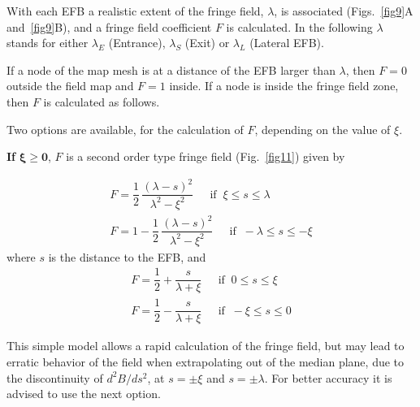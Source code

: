 {With  each EFB a realistic extent of the fringe field, $\lambda$, 
is associated (Figs.~\ref{fig9}A and~\ref{fig9}B),  
and a fringe field coefficient $ F$ is 
calculated. In the following $\lambda$ stands for either $ \lambda_ E $
(Entrance), $ \lambda_ S $ (Exit) or $ \lambda_ L $ (Lateral EFB). 
 
\noindent If a node of the map mesh is at a distance of the EFB larger than
$\lambda$, then $  F=0 $ outside the field map and $ F=1 $ inside.  
If a node is inside the fringe field zone, then $  F$   is calculated as follows. 

\bigskip 

\noindent Two options are available, for the calculation of $ F$, depending
on the value of $\xi$. 

\medskip
\noindent\textbf{If } $\mathbf{\xi  \geq 0}$, $ F $ is a  second
order type fringe field (Fig.~\ref{fig11}) given by 


\begin{gather}
		F  = \dfrac{1 }{ 2} \, \dfrac{(\lambda -s)^2 }{ \lambda^2-\xi^ 2} \quad 
		         ~~ \text{if }~   \xi  \leq  s \leq \lambda  \\
		F  = 1- \dfrac{1 }{ 2} \, \dfrac{(\lambda -s)^2 }{ \lambda^2-\xi^ 2}\quad 
		        ~~ \text{if }~   -\lambda  \leq  s \leq  -\xi 
\end{gather}
where $ s $ is the distance to the EFB, and
\begin{gather}
		 F  = \dfrac{1 }{ 2} + \dfrac{s }{ \lambda +\xi} \quad
		         ~~ \text{if }~  0 \leq  s \leq  \xi  \\
	    F   = \dfrac{1 }{ 2} - \dfrac{s }{ \lambda +\xi}\quad  
		       ~~ \text{if }~   -\xi  \leq  s \leq  0  
\end{gather}
 
\noindent This simple model allows a rapid calculation of the fringe field,
but may lead to erratic behavior of the field when extrapolating out of the median plane, 
due to the discontinuity of $ d^2B/ds^2 $,  at $ s=\pm \xi $ and $ s=\pm \lambda $. 
For better  accuracy it is advised to use the next option. 

}
